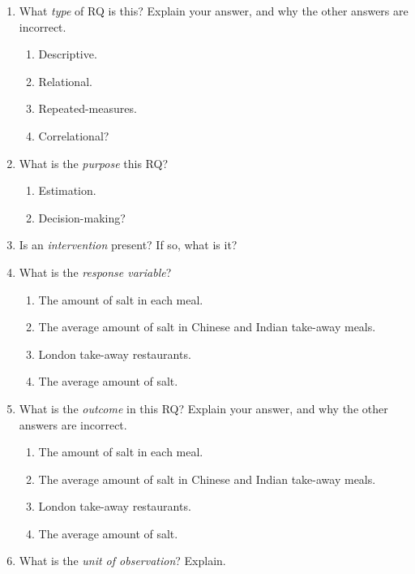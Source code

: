 \documentclass[
  11pt,
  a4paper,
  krantz2]{krantz}
\providecommand{\tightlist}{%
  \setlength{\itemsep}{0pt}\setlength{\parskip}{0pt}}
\newlength{\greyboxheight}
\newcommand{\setgreyboxheight}[1]{%
  \setlength{\greyboxheight}{2.3\baselineskip * #1}%
}
\newenvironment{greybox}[1]{%
  \nopagebreak
  \setgreyboxheight{#1}%
  \begin{tcolorbox}[
    colframe=gray!30!black,
    boxrule=2pt,
    width=\linewidth,
    height=\greyboxheight,
    valign=center,
    colback=white,
    left=4pt,
    right=4pt, 
    top=4pt, 
    bottom=4pt,
    before skip=4pt,
    after skip=4pt
  ]
\vspace*{\greyboxheight} %
}{%
  \end{tcolorbox}
  \goodbreak
}
\newcommand{\answerbox}[1]{\noindent\begin{greybox}{#1}\end{greybox}}
\begin{document}
\begin{enumerate}
\def\labelenumi{\arabic{enumi}.}
\item
  What \emph{type} of RQ is this? \tightlist
  Explain your answer, and why the other answers are incorrect.

  \begin{enumerate}
  \def\labelenumii{\alph{enumii}.}
  \tightlist
  \item
    Descriptive.
  \item
    Relational.
  \item
    Repeated-measures.
  \item
    Correlational?
  \end{enumerate}
\item
  What is the \emph{purpose} this RQ? \tightlist

  \begin{enumerate}
  \def\labelenumii{\alph{enumii}.}
  \tightlist
  \item
    Estimation.
  \item
    Decision-making?
  \end{enumerate}
\item
  Is an \emph{intervention} present?
  If so, what is it?
  \answerbox{2}
\item
  What is the \emph{response variable}?

  \begin{enumerate}
  \def\labelenumii{\alph{enumii}.}
  \tightlist
  \item
    The amount of salt in each meal.
  \item
    The average amount of salt in Chinese and Indian take-away meals.
  \item
    London take-away restaurants.
  \item
    The average amount of salt.
  \end{enumerate}
\item
  What is the \emph{outcome} in this RQ?
  Explain your answer, and why the other answers are incorrect.

  \begin{enumerate}
  \def\labelenumii{\alph{enumii}.}
  \tightlist
  \item
    The amount of salt in each meal.
  \item
    The average amount of salt in Chinese and Indian take-away meals.
  \item
    London take-away restaurants.
  \item
    The average amount of salt.
  \end{enumerate}
\item
  What is the \emph{unit of observation}?
  Explain.


\end{enumerate}
\end{document}
